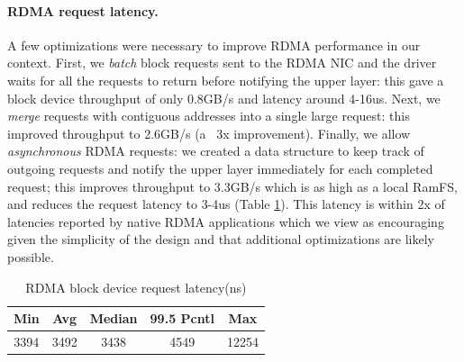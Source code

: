 \paragraph{RDMA request latency.} A few optimizations were necessary to improve RDMA performance in our context. First, we \emph{batch} block requests sent to the RDMA NIC and the driver waits for all the requests to return before notifying the upper layer: this gave a block device throughput of only 0.8GB/s and latency around 4-16us.
Next, we \emph{merge} requests with contiguous addresses into a single large request: this improved throughput to 2.6GB/s (a ~3x improvement).
Finally, we allow \emph{asynchronous} RDMA requests: we created a data structure to keep track of outgoing requests and notify the upper layer immediately for each completed request; this improves throughput to 3.3GB/s which is as high as a local RamFS, and reduces the request latency to 3-4us (Table \ref{tab:rdma_latency}). 
This latency is within 2x of latencies reported by native RDMA applications which we view as encouraging given the simplicity of the design and that additional optimizations are likely possible.

\begin{table}[t]
    \centering
    \small
    \begin{tabular}{ccccc}
    \textbf{Min}	& \textbf{Avg}	& \textbf{Median} & \textbf{99.5 Pcntl}	& \textbf{Max}\\
    \hline
    3394 &	3492&	3438&	4549&	12254\\\hline
    \end{tabular}
    \caption{RDMA block device request latency(ns)}
    \label{tab:rdma_latency}
\end{table}




